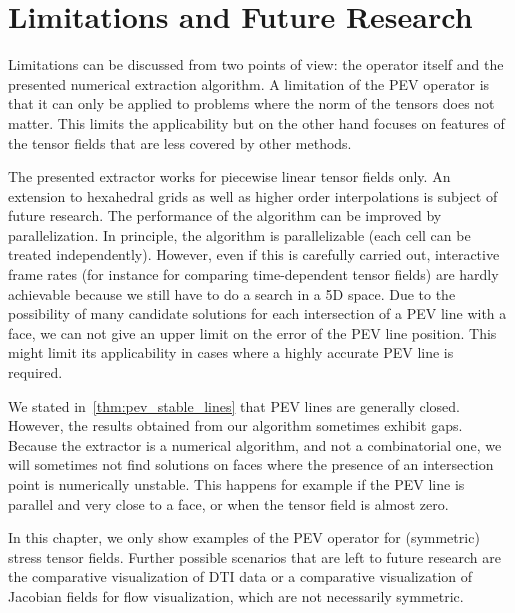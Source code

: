 \section{Limitations and Future Research} %
\label{sec:pev_limitations}
% 
Limitations can be discussed from two points of view:
%
the operator itself and the presented numerical extraction algorithm.
%
A limitation of the \ac{PEV} operator is that it can only be applied to problems
where the norm of the tensors does not matter.
%
This limits the applicability but on the other hand focuses on features of the
tensor fields that are less covered by other methods.
%

%
The presented extractor works for piecewise linear tensor fields only.
%
An extension to hexahedral grids as well as higher order interpolations is
subject of future research.
%
The performance of the algorithm can be improved by parallelization.
%
In principle, the algorithm is parallelizable (each cell can be treated
independently).
%
However, even if this is carefully carried out, interactive frame rates (for
instance for comparing time-dependent tensor fields) are hardly achievable
because we still have to do a search in a \ac{5D} space.
%
Due to the possibility of many candidate solutions for each intersection of a
\ac{PEV} line with a face, we can not give an upper limit on the error of the
\ac{PEV} line position.
%
This might limit its applicability in cases where a highly accurate \ac{PEV} line is
required.
%

%
%
We stated in~\cref{thm:pev_stable_lines} that \ac{PEV} lines are generally closed.
%
However, the results obtained from our algorithm sometimes exhibit gaps.
%
Because the extractor is a numerical algorithm, and not a combinatorial one, we
will sometimes not find solutions on faces where the presence of an intersection
point is numerically unstable.
%
This happens for example if the \ac{PEV} line is parallel and very close to a face,
or when the tensor field is almost zero.
%
%

%
In this chapter, we only show examples of the \ac{PEV} operator for (symmetric)
stress tensor fields.
%
Further possible scenarios that are left to future research are the comparative
visualization of \ac{DTI} data or a comparative visualization of Jacobian fields
for flow visualization, which are not necessarily symmetric.
%